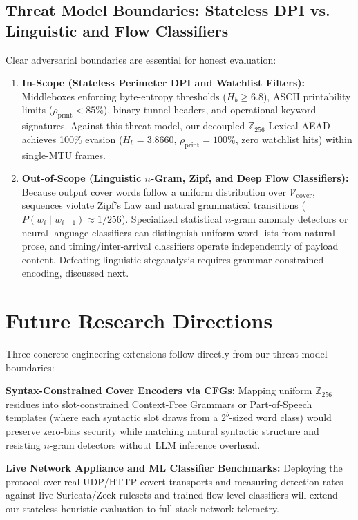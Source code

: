 \documentclass[conference]{IEEEtran}
\begin{document}
\subsection{Threat Model Boundaries: Stateless DPI vs. Linguistic and Flow Classifiers}
Clear adversarial boundaries are essential for honest evaluation:
\begin{enumerate}
    \item \textbf{In-Scope (Stateless Perimeter DPI and Watchlist Filters):} Middleboxes enforcing byte-entropy thresholds ($H_b \ge 6.8$), ASCII printability limits ($\rho_{\text{print}} < 85\%$), binary tunnel headers, and operational keyword signatures. Against this threat model, our decoupled $\mathbb{Z}_{256}$ Lexical AEAD achieves 100\% evasion ($H_b = 3.8660$, $\rho_{\text{print}} = 100\%$, zero watchlist hits) within single-MTU frames.
    \item \textbf{Out-of-Scope (Linguistic $n$-Gram, Zipf, and Deep Flow Classifiers):} Because output cover words follow a uniform distribution over $\mathcal{V}_{\text{cover}}$, sequences violate Zipf's Law and natural grammatical transitions ($P(w_i \mid w_{i-1}) \approx 1/256$). Specialized statistical $n$-gram anomaly detectors or neural language classifiers \cite{adeeb2025steggpt, wang2025multiclassification} can distinguish uniform word lists from natural prose, and timing/inter-arrival classifiers \cite{sun2022deep, alazzam2026advanced} operate independently of payload content. Defeating linguistic steganalysis requires grammar-constrained encoding, discussed next.
\end{enumerate}

\section{Future Research Directions}
\label{sec:future}

Three concrete engineering extensions follow directly from our threat-model boundaries:

\textbf{Syntax-Constrained Cover Encoders via CFGs:} Mapping uniform $\mathbb{Z}_{256}$ residues into slot-constrained Context-Free Grammars or Part-of-Speech templates (where each syntactic slot draws from a $2^b$-sized word class) would preserve zero-bias security while matching natural syntactic structure and resisting $n$-gram detectors without LLM inference overhead.

\textbf{Live Network Appliance and ML Classifier Benchmarks:} Deploying the protocol over real UDP/HTTP covert transports and measuring detection rates against live Suricata/Zeek rulesets and trained flow-level classifiers will extend our stateless heuristic evaluation to full-stack network telemetry.
\end{document}
